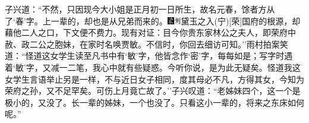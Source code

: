 {子兴道：``不然，只因现今大小姐是正月初一日所生，故名元春，馀者方从了`春'字。上一辈的，却也是从兄弟而来的。{\includegraphics[width=3mm]{../Images/00006}\includegraphics[width=3mm]{../Images/00011}\footnotesize \kaishu 黛玉之入{(宁)}{[}荣{]}国府的根源，却藉他二人之口，下文便不费力。}现有对证：目今你贵东家林公之夫人，即荣府中赦、政二公之胞妹，在家时名唤贾敏。不信时，你回去细访可知。''雨村拍案笑道：``怪道这女学生读至凡书中有`敏'字，他皆念作`密'字，每每如是；写字时遇着`敏'字，又减一二笔，我心中就有些疑惑。今听你说，是为此无疑矣。怪道我这女学生言语举止另是一样，不与近日女子相同，度其母必不凡，方得其女，今知为荣府之孙，又不足罕矣。可伤上月竟亡故了。''子兴叹道：``老姊妹四个，这一个是极小的，又没了。长一辈的姊妹，一个也没了。只看这小一辈的，将来之东床如何呢。''

}
